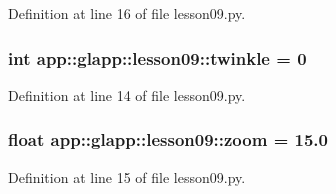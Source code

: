 Definition at line 16 of file lesson09.py.
\subsubsection{\setlength{\rightskip}{0pt plus 5cm}int {\bf app::glapp::lesson09::twinkle} = 0\hspace{0.3cm}{\tt  [static]}}\label{namespaceapp_1_1glapp_1_1lesson09_005fc456ceca69c3289905b2c061e66c}




Definition at line 14 of file lesson09.py.
\subsubsection{\setlength{\rightskip}{0pt plus 5cm}float {\bf app::glapp::lesson09::zoom} = 15.0\hspace{0.3cm}{\tt  [static]}}\label{namespaceapp_1_1glapp_1_1lesson09_08f04f57c64d4a861e104b061bee7464}




Definition at line 15 of file lesson09.py.